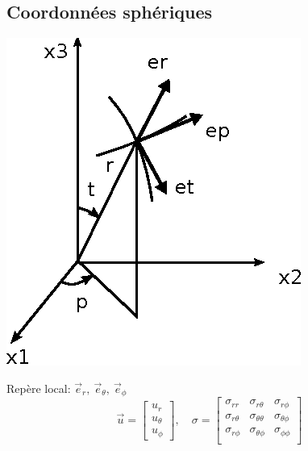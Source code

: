 \subsection{Coordonnées sphériques}
\begin{multicols}{2}
    \includegraphics{../images/T1_AnnA-0003}
    \columnbreak

    Repère local: $\vec{e}_r,\ \vec{e}_{\theta},\ \vec{e}_{\phi}$
    \begin{displaymath}
        \vec{u} = 
        \begin{bmatrix}
            u_r \\
            u_{\theta} \\
            u_{\phi}
        \end{bmatrix}, \quad
        \mathbb{\sigma} = 
        \begin{bmatrix}
            \sigma_{rr} & \sigma_{r\theta} & \sigma_{r\phi} \\
            \sigma_{r\theta} & \sigma_{\theta\theta} & \sigma_{\theta\phi} \\
            \sigma_{r\phi} & \sigma_{\theta\phi} & \sigma_{\phi\phi} \\
        \end{bmatrix}
    \end{displaymath}
\end{multicols}

